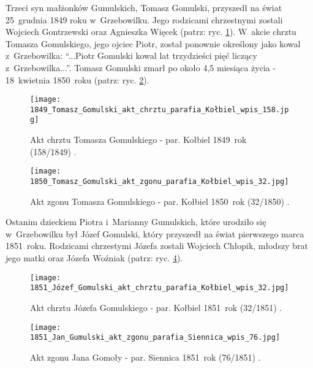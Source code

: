 Trzeci syn małżonków Gumulskich, Tomasz Gomulski, przyszedł na świat 
25~grudnia 1849 roku w~Grzebowilku. Jego rodzicami chrzestnymi zostali 
Wojciech Gontrzewski oraz Agnieszka Więcek (patrz: ryc. 
\ref{fig:tgomulski_1849}). W~akcie chrztu Tomasza Gomulskiego, jego ojciec 
Piotr, został ponownie określony jako kowal z~Grzebowilka: \enquote{...Piotr 
Gomulski kowal lat trzydzieści pięć liczący z~Grzebowilka...}. Tomasz 
Gomulski zmarł po około 4,5 miesiąca życia - 18~kwietnia 1850~roku (patrz: 
ryc. \ref{fig:tgomulski_1850}).

\begin{figure}[!ht]
    \vspace*{0.5cm}
    \centering \texttt{[image: 
        1849\_Tomasz\_Gomulski\_akt\_chrztu\_parafia\_Kołbiel\_wpis\_158.jpg]}
    \captionsetup{format=hang}
    \caption{Akt chrztu Tomasza Gomulskiego - par. Kołbiel 1849~rok 
    (158/1849) \cite{par_kolbiel2}.}
    \label{fig:tgomulski_1849}
\end{figure}

\begin{figure}[!ht]
    \vspace*{0.5cm}
    \centering \texttt{[image: 
        1850\_Tomasz\_Gomulski\_akt\_zgonu\_parafia\_Kołbiel\_wpis\_32.jpg]}
    \captionsetup{format=hang}
    \caption{Akt zgonu Tomasza Gomulskiego - par. Kołbiel 1850~rok 
    (32/1850) \cite{par_kolbiel2}.}
    \label{fig:tgomulski_1850}
\end{figure}

Ostanim dzieckiem Piotra i~Marianny Gumulskich, które urodziło się 
w~Grzebowilku był Józef Gomulski, który przyszedł na świat pierwszego marca 
1851~roku. Rodzicami chrzestymi Józefa zostali Wojciech Chłopik, młodszy brat 
jego matki oraz Józefa Woźniak (patrz: ryc. \ref{fig:jgomulski_1851}).

\begin{figure}[!ht]
    \vspace*{0.5cm}
    \centering \texttt{[image: 
        1851\_Józef\_Gomulski\_akt\_chrztu\_parafia\_Kołbiel\_wpis\_32.jpg]}
    \captionsetup{format=hang}
    \caption{Akt chrztu Józefa Gomulskiego - par. Kołbiel 1851~rok 
    (32/1851) \cite{par_kolbiel2}.}
    \label{fig:jgomulski_1851}
\end{figure}

\begin{figure}[!ht]
    \vspace*{0.5cm}
    \centering \texttt{[image: 
        1851\_Jan\_Gumulski\_akt\_zgonu\_parafia\_Siennica\_wpis\_76.jpg]}
    \captionsetup{format=hang}
    \caption{Akt zgonu Jana Gomoły - par. Siennica 1851~rok 
    (76/1851) \cite{par_siennica}.}
    \label{fig:jgomulski_1851}
\end{figure}

